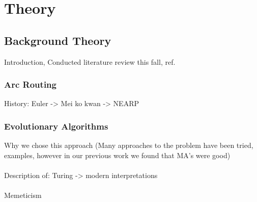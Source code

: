 \chapter{Theory}

\section{Background Theory}
Introduction, Conducted literature review this fall, ref.

\subsection{Arc Routing}
History:
Euler -> Mei ko kwan -> NEARP

\subsection{Evolutionary Algorithms}
Why we chose this approach
	(Many approaches to the problem have been tried, examples, however in our previous work we found that MA's were good)
\\\\
Description of:
Turing -> modern interpretations
\\\\
Memeticism

\cleardoublepage